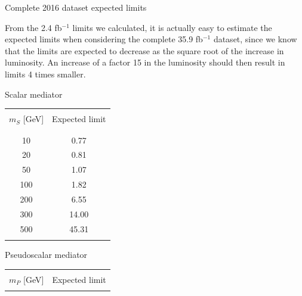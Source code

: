\documentclass[8 pt]{beamer}
\begin{document}
\begin{frame}{Complete 2016 dataset expected limits}

	\justifying
	From the 2.4 fb$^{-1}$ limits we calculated, it is actually easy to estimate the expected limits when considering the complete 35.9 fb$^{-1}$ dataset, since we know that the limits are expected to decrease as the square root of the increase in luminosity. An increase of a factor 15 in the luminosity should then result in limits 4 times smaller. \vfill

   \begin{center}
   	 \begin{minipage}[c]{.48\linewidth}
	 \begin{exampleblock}{} { \begin{center} Scalar mediator \end{center}} \end{exampleblock}
    	\begin{center}
   	\begin{tabular}{c|c}
		& \\
		$m_S$ [GeV]& Expected limit  \\ 
		& \\ 
		\hline \hline
		& \\
		10 &  0.77\\
            	20 &  0.81\\
            	50 & 1.07 \\
            	100 & 1.82  \\
            	200 & 6.55 \\
            	300 & 14.00\\
            	500 & 45.31 \\
		& \\
          \end{tabular}
          \end{center}
   \end{minipage} \hfill
   \begin{minipage}[c]{.48\linewidth}
   	\begin{exampleblock}{} { \begin{center} Pseudoscalar mediator \end{center}} \end{exampleblock}
   	\begin{center}
   	\begin{tabular}{c|c}
		& \\
		$m_P$ [GeV]& Expected limit  \\ 
		& \\ 

\end{tabular}
\end{center}
\end{minipage}
\end{center}
\end{frame}
\end{document}

